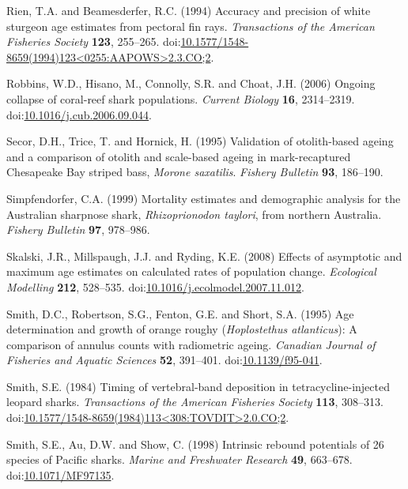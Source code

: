 \documentclass[]{article}
\begin{document}
\hypertarget{ref-rien_accuracy_1994}{}
Rien, T.A. and Beamesderfer, R.C. (1994) Accuracy and precision of white
sturgeon age estimates from pectoral fin rays. \emph{Transactions of the
American Fisheries Society} \textbf{123}, 255--265.
doi:\href{https://doi.org/10.1577/1548-8659(1994)123\%3C0255:AAPOWS\%3E2.3.CO;2}{10.1577/1548-8659(1994)123\textless{}0255:AAPOWS\textgreater{}2.3.CO;2}.

\hypertarget{ref-robbins_ongoing_2006}{}
Robbins, W.D., Hisano, M., Connolly, S.R. and Choat, J.H. (2006) Ongoing
collapse of coral-reef shark populations. \emph{Current Biology}
\textbf{16}, 2314--2319.
doi:\href{https://doi.org/10.1016/j.cub.2006.09.044}{10.1016/j.cub.2006.09.044}.

\hypertarget{ref-secor_validation_1995}{}
Secor, D.H., Trice, T. and Hornick, H. (1995) Validation of
otolith-based ageing and a comparison of otolith and scale-based ageing
in mark-recaptured Chesapeake Bay striped bass, \emph{Morone saxatilis}.
\emph{Fishery Bulletin} \textbf{93}, 186--190.

\hypertarget{ref-simpfendorfer_mortality_1999}{}
Simpfendorfer, C.A. (1999) Mortality estimates and demographic analysis
for the Australian sharpnose shark, \emph{Rhizoprionodon taylori}, from
northern Australia. \emph{Fishery Bulletin} \textbf{97}, 978--986.

\hypertarget{ref-skalski_effects_2008}{}
Skalski, J.R., Millspaugh, J.J. and Ryding, K.E. (2008) Effects of
asymptotic and maximum age estimates on calculated rates of population
change. \emph{Ecological Modelling} \textbf{212}, 528--535.
doi:\href{https://doi.org/10.1016/j.ecolmodel.2007.11.012}{10.1016/j.ecolmodel.2007.11.012}.

\hypertarget{ref-smith_age_1995}{}
Smith, D.C., Robertson, S.G., Fenton, G.E. and Short, S.A. (1995) Age
determination and growth of orange roughy (\emph{Hoplostethus
atlanticus}): A comparison of annulus counts with radiometric ageing.
\emph{Canadian Journal of Fisheries and Aquatic Sciences} \textbf{52},
391--401. doi:\href{https://doi.org/10.1139/f95-041}{10.1139/f95-041}.

\hypertarget{ref-smith_timing_1984}{}
Smith, S.E. (1984) Timing of vertebral-band deposition in
tetracycline-injected leopard sharks. \emph{Transactions of the American
Fisheries Society} \textbf{113}, 308--313.
doi:\href{https://doi.org/10.1577/1548-8659(1984)113\%3C308:TOVDIT\%3E2.0.CO;2}{10.1577/1548-8659(1984)113\textless{}308:TOVDIT\textgreater{}2.0.CO;2}.

\hypertarget{ref-smith_intrinsic_1998}{}
Smith, S.E., Au, D.W. and Show, C. (1998) Intrinsic rebound potentials
of 26 species of Pacific sharks. \emph{Marine and Freshwater Research}
\textbf{49}, 663--678.
doi:\href{https://doi.org/10.1071/MF97135}{10.1071/MF97135}.
\end{document}
